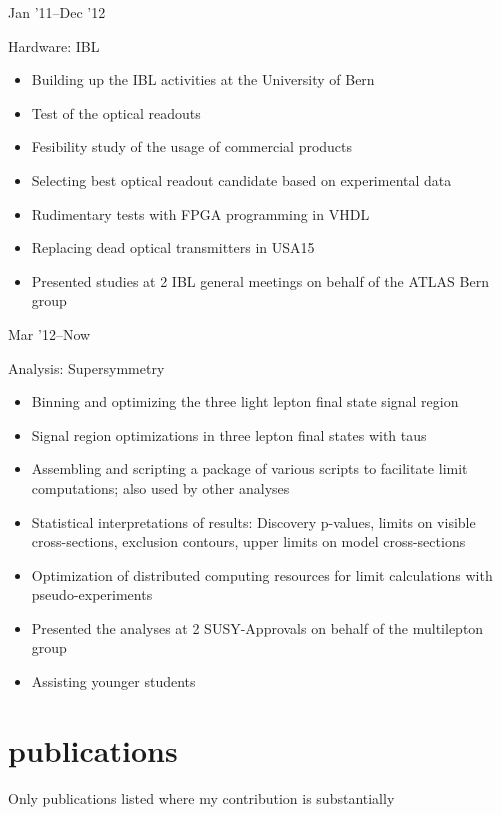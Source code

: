 \documentclass[]{cv} %
\begin{document}
\begin{entrylist}

  \entry
  {Jan '11--Dec '12}
  {Hardware: IBL{\normalfont
    \begin{itemize}
      \item Building up the IBL activities at the University of Bern
      \item Test of the optical readouts
      \item Fesibility study of the usage of commercial products
      \item Selecting best optical readout candidate based on experimental data
      \item Rudimentary tests with FPGA programming in VHDL
      \item Replacing dead optical transmitters in USA15
      \item Presented studies at 2 IBL general meetings on behalf of the ATLAS Bern group
  \end{itemize}}}
  {}
  {\vspace*{-22pt}}

\entry
{Mar '12--Now}
{Analysis: Supersymmetry{\normalfont
  \begin{itemize}
  \item Binning and optimizing the three light lepton final state signal region
  \item Signal region optimizations in three lepton final states with taus
  \item Assembling and scripting a package of various scripts to facilitate limit computations; also used by other analyses
  \item Statistical interpretations of results: Discovery p-values, limits on visible cross-sections, exclusion contours, upper limits on model cross-sections
  \item Optimization of distributed computing resources for limit calculations with pseudo-experiments
  \item Presented the analyses at 2 SUSY-Approvals on behalf of the multilepton group
  \item Assisting younger students
\end{itemize}}}
{}
  {\vspace*{-22pt}}

\end{entrylist}

\section{publications}
Only publications listed where my contribution is substantially
\end{document}
